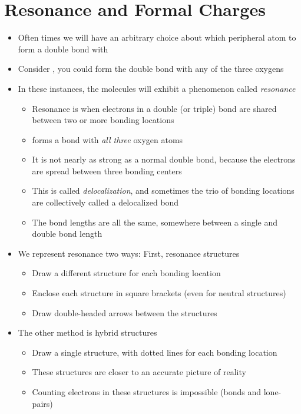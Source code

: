 \documentclass[12pt, openany, letterpaper]{memoir}
\begin{document}
\section{Resonance and Formal Charges}
\begin{itemize}
	\item Often times we will have an arbitrary choice about which peripheral atom to form a double bond with
	\item Consider , you could form the double bond with any of the three oxygens
	\item In these instances, the molecules will exhibit a phenomenon called \emph{resonance}
	\begin{itemize}
		\item Resonance is when electrons in a double (or triple) bond are shared between two or more bonding locations
		\item {} forms a bond with \emph{all three} oxygen atoms
		\item It is not nearly as strong as a normal double bond, because the electrons are spread between three bonding centers
		\item This is called \emph{delocalization}, and sometimes the trio of bonding locations are collectively called a delocalized bond
		\item The bond lengths are all the same, somewhere between a single and double bond length
	\end{itemize}
	\item We represent resonance two ways: First, resonance structures
	\begin{itemize}
		\item Draw a different structure for each bonding location
		\item Enclose each structure in square brackets (even for neutral structures)
		\item Draw double-headed arrows between the structures
	\end{itemize}
	\item The other method is hybrid structures
	\begin{itemize}
		\item Draw a single structure, with dotted lines for each bonding location
		\item These structures are closer to an accurate picture of reality
		\item Counting electrons in these structures is impossible (bonds and lone-pairs) 
	\end{itemize}


\end{itemize}
\end{document}
